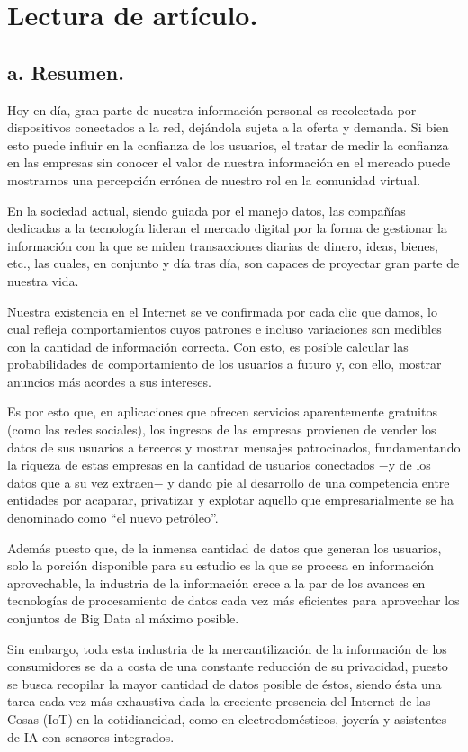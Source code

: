 \section{Lectura de artículo.}
\subsection*{a. Resumen.}

Hoy en día, gran parte de nuestra información personal es recolectada por dispositivos conectados a la red, dejándola sujeta a la oferta y demanda. Si bien esto puede influir en la confianza de los usuarios, el tratar de medir la confianza en las empresas sin conocer el valor de nuestra información en el mercado puede mostrarnos una percepción errónea de nuestro rol en la comunidad virtual.

En la sociedad actual, siendo guiada por el manejo datos, las compañías dedicadas a la tecnología lideran el mercado digital por la forma de gestionar la información con la que se miden transacciones diarias de dinero, ideas, bienes, etc., las cuales, en conjunto y día tras día, son capaces de proyectar gran parte de nuestra vida.

Nuestra existencia en el Internet se ve confirmada por cada clic que damos, lo cual refleja comportamientos cuyos patrones e incluso variaciones son medibles con la cantidad de información correcta. Con esto, es posible calcular las probabilidades de comportamiento de los usuarios a futuro y, con ello, mostrar anuncios más acordes a sus intereses.

Es por esto que, en aplicaciones que ofrecen servicios aparentemente gratuitos (como las redes sociales), los ingresos de las empresas provienen de vender los datos de sus usuarios a terceros y mostrar mensajes patrocinados, fundamentando la riqueza de estas empresas en la cantidad de usuarios conectados $-$y de los datos que a su vez extraen$-$ y dando pie al desarrollo de una competencia entre entidades por acaparar, privatizar y explotar aquello que empresarialmente se ha denominado como “el nuevo petróleo”.

Además puesto que, de la inmensa cantidad de datos que generan los usuarios, solo la porción disponible para su estudio es la que se procesa en información aprovechable, la industria de la información crece a la par de los avances en tecnologías de procesamiento de datos cada vez más eficientes para aprovechar los conjuntos de Big Data al máximo posible.

Sin embargo, toda esta industria de la mercantilización de la información de los consumidores se da a costa de una constante reducción de su privacidad, puesto se busca recopilar la mayor cantidad de datos posible de éstos, siendo ésta una tarea cada vez más exhaustiva dada la creciente presencia del Internet de las Cosas (IoT) en la cotidianeidad, como en electrodomésticos, joyería y asistentes de IA con sensores integrados.

